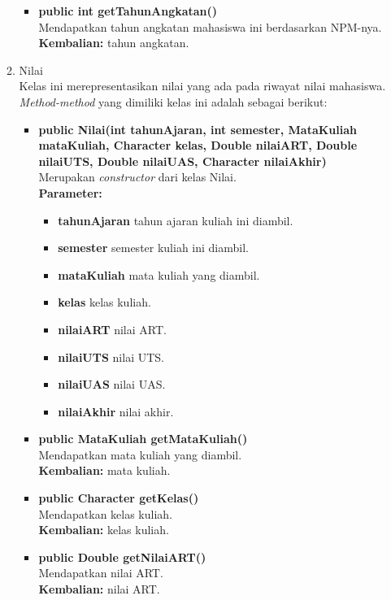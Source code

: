 \begin{enumerate}
\begin{enumerate}
\begin{itemize}
			\item \textbf{public int getTahunAngkatan()}\\
				Mendapatkan tahun angkatan mahasiswa ini berdasarkan NPM-nya.\\
				\textbf{Kembalian:} tahun angkatan.
			\end{itemize}
		
		\item Nilai\\
		Kelas ini merepresentasikan nilai yang ada pada riwayat nilai mahasiswa. \textit{Method-method} yang dimiliki kelas ini adalah sebagai berikut:
		\begin{itemize}
			\item \textbf{public Nilai(int tahunAjaran, int semester, MataKuliah mataKuliah, Character kelas, Double nilaiART, Double nilaiUTS, Double nilaiUAS, Character nilaiAkhir)}\\
				Merupakan \textit{constructor} dari kelas Nilai.\\
				\textbf{Parameter:}
				\begin{itemize}
					\item \textbf{tahunAjaran} tahun ajaran kuliah ini diambil.
					\item \textbf{semester} semester kuliah ini diambil.
					\item \textbf{mataKuliah} mata kuliah yang diambil.
					\item \textbf{kelas} kelas kuliah.
					\item \textbf{nilaiART} nilai ART.
					\item \textbf{nilaiUTS} nilai UTS.
					\item \textbf{nilaiUAS} nilai UAS.
					\item \textbf{nilaiAkhir} nilai akhir.
				\end{itemize}
				
			\item \textbf{public MataKuliah getMataKuliah()}\\
				Mendapatkan mata kuliah yang diambil.\\
				\textbf{Kembalian:} mata kuliah.
				
			\item \textbf{public Character getKelas()}\\
				Mendapatkan kelas kuliah.\\
				\textbf{Kembalian:} kelas kuliah.
				
			\item \textbf{public Double getNilaiART()}\\
				Mendapatkan nilai ART.\\
				\textbf{Kembalian:} nilai ART.
				

\end{itemize}
\end{enumerate}
\end{enumerate}
